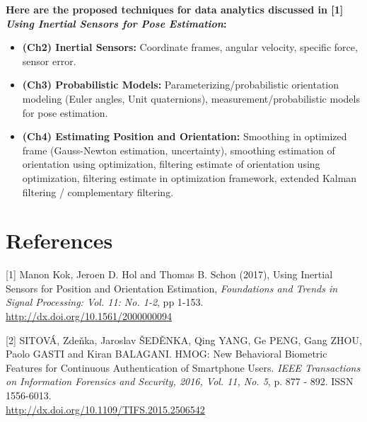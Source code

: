 \documentclass{article}
\begin{document}
\textbf{Here are the proposed techniques for data analytics discussed
in [1] \textit{Using Inertial Sensors for Pose Estimation}:}

\begin{itemize}
  \item \textbf{(Ch2) Inertial Sensors:} Coordinate frames, angular
    velocity, specific force, sensor error.
  \item \textbf{(Ch3) Probabilistic Models:} Parameterizing/probabilistic
    orientation modeling (Euler angles, Unit quaternions),
    measurement/probabilistic models for pose estimation.
  \item \textbf{(Ch4) Estimating Position and Orientation:} Smoothing
    in optimized frame (Gauss-Newton estimation, uncertainty),
    smoothing estimation of orientation using optimization, filtering
    estimate of orientation using optimization, filtering estimate in
    optimization framework, extended Kalman filtering / complementary
    filtering.
\end{itemize}

\section*{References}

\small

[1] Manon Kok, Jeroen D. Hol and Thomas B. Schon (2017), Using
Inertial Sensors for Position and Orientation Estimation,
{\it Foundations and Trends in Signal Processing: Vol. 11: No. 1-2},
pp 1-153. \\ \url{http://dx.doi.org/10.1561/2000000094}

[2] SITOVÁ, Zdeňka, Jaroslav ŠEDĚNKA, Qing YANG, Ge PENG, Gang ZHOU,
Paolo GASTI and Kiran BALAGANI. HMOG: New Behavioral Biometric Features
for Continuous Authentication of Smartphone Users. {\it IEEE Transactions on
Information Forensics and Security, 2016, Vol. 11, No. 5}, p. 877 - 892.
ISSN 1556-6013. \\ \url{http://dx.doi.org/10.1109/TIFS.2015.2506542}
\end{document}
